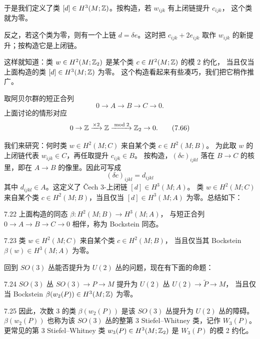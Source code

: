 于是我们定义了类 $[d]\in H^3(M;\mathbb{Z})$。按构造，若 $w_{ijk}$ 有上闭链提升 $c_{ijk}$，
这个类就为零。

反之，若这个类为零，则有一个上链 $d=\delta e$。这时把 $c_{ijk}+2e_{ijk}$ 取作
$w_{ijk}$ 的新提升；按构造它是上闭链。

这样就知道：类 $w\in H^2(M;\mathbb{Z}_2)$ 是某个类 $c\in H^2(M;\mathbb{Z})$ 的模 2 约化，
当且仅当上面构造的类 $[d]\in H^3(M;\mathbb{Z})$ 为零。
这个构造看起来有些凑巧，我们把它稍作推广。

取阿贝尔群的短正合列
\begin{equation}
0\to A\to B\to C\to 0.
\tag{7.65}
\end{equation}
上面讨论的情形对应
\begin{equation}
0\to\mathbb{Z}\xrightarrow{\times2}\mathbb{Z}\xrightarrow{\bmod 2}\mathbb{Z}_2\to 0.
\tag{7.66}
\end{equation}

我们来研究：何时类 $w\in H^2(M;C)$ 来自某个类 $c\in H^2(M;B)$。
为此取 $w$ 的上闭链代表 $w_{ijk}\in C$，再任取提升 $c_{ijk}\in B$。
按构造，$(\delta c)_{ijkl}$ 落在 $B\to C$ 的核里，即在 $A\to B$ 的像里。因此可写成
\begin{equation}
(\delta c)_{ijkl}=d_{ijkl}
\tag{7.67}
\end{equation}
其中 $d_{ijkl}\in A$。这定义了 Čech 3-上闭链 $[d]\in H^3(M;A)$。
类 $w\in H^2(M;C)$ 来自某个类 $c\in H^2(M;B)$，当且仅当 $[d]\in H^3(M;A)$ 为零。总结如下：

\begin{definition}{7.22}
上面构造的同态 $\beta:H^2(M;B)\to H^3(M;A)$，
与短正合列 $0\to A\to B\to C\to 0$ 相伴，称为 Bockstein 同态。
\end{definition}

\begin{proposition}{7.23}
类 $w\in H^2(M;C)$ 来自某个类 $c\in H^2(M;B)$，
当且仅当其 Bockstein $\beta(w)\in H^3(M;A)$ 为零。
\end{proposition}

回到 $SO(3)$ 丛能否提升为 $U(2)$ 丛的问题，现在有下面的命题：

\begin{proposition}{7.24}
$SO(3)$ 丛 $SO(3)\to P\to M$ 提升为 $U(2)$ 丛 $U(2)\to\tilde P\to M$，
当且仅当 Bockstein $\beta(w_2(P))\in H^3(M;\mathbb{Z})$ 为零。
\end{proposition}

\begin{remark}{7.25}
因此，次数 3 的类 $\beta(w_2(P))$ 是该 $SO(3)$ 丛提升为 $U(2)$ 丛的障碍。
$\beta(w_2(P))$ 也称为该 $SO(3)$ 丛的整第 3 Stiefel--Whitney 类，记作 $W_3(P)$。
更常见的第 3 Stiefel--Whitney 类 $w_3(P)\in H^3(M;\mathbb{Z}_2)$ 是 $W_3(P)$ 的模 2 约化。
\end{remark}

